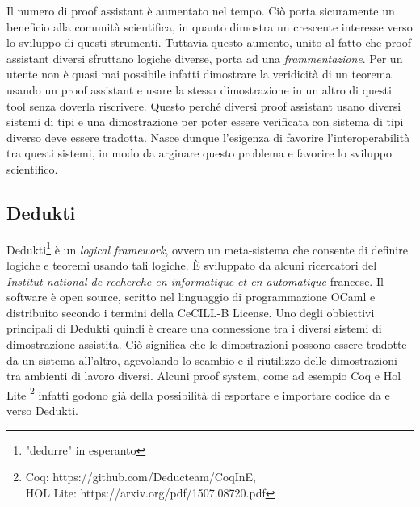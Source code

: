 \documentclass[12pt,a4paper]{report}
\begin{document}
Il numero di proof assistant è aumentato nel tempo. Ciò porta sicuramente un
beneficio alla comunità scientifica, in quanto dimostra un crescente interesse
verso lo sviluppo di questi strumenti. Tuttavia questo aumento, unito al fatto
che proof assistant diversi sfruttano logiche diverse, porta ad una \textit{
frammentazione}. Per un utente non è quasi mai possibile infatti dimostrare la
veridicità di un teorema usando un proof assistant e usare la stessa dimostrazione
in un altro di questi tool senza doverla riscrivere.
Questo perché diversi proof assistant usano diversi sistemi di tipi e una dimostrazione
per poter essere verificata con sistema di tipi diverso deve essere tradotta.
Nasce dunque l'esigenza di favorire l'interoperabilità tra questi sistemi, in
modo da arginare questo problema e favorire lo sviluppo scientifico. 

\subsection{Dedukti}
Dedukti\footnote{"dedurre" in esperanto} è un \textit{logical framework}, ovvero
un meta-sistema che consente di definire logiche e teoremi usando tali logiche.
È sviluppato da alcuni ricercatori del \textit{Institut national de recherche
en informatique et en automatique} francese. Il software è open source, scritto
nel linguaggio di programmazione OCaml e distribuito secondo i termini della
CeCILL-B License. Uno degli obbiettivi principali di Dedukti quindi è creare
una connessione tra i diversi sistemi di dimostrazione assistita. Ciò significa
che le dimostrazioni possono essere tradotte da un sistema all'altro, agevolando
lo scambio e il riutilizzo delle dimostrazioni tra ambienti di lavoro diversi.
Alcuni proof system, come ad esempio Coq e Hol Lite \footnote{Coq: https://github.com/Deducteam/CoqInE,\\ HOL Lite: https://arxiv.org/pdf/1507.08720.pdf}
infatti godono già della possibilità di esportare e importare codice da e verso
Dedukti.
\end{document}
